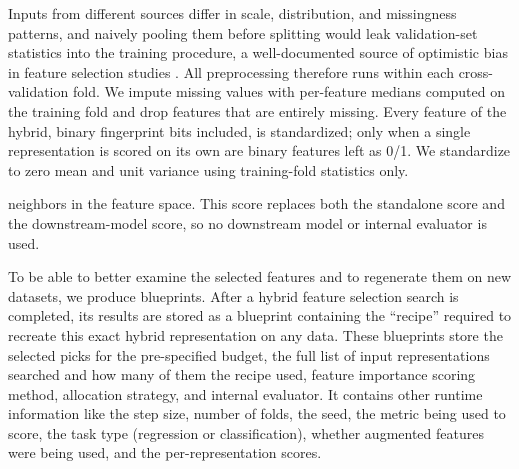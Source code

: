 Inputs from different sources differ in scale, distribution, and missingness patterns, and naively pooling them before splitting would leak validation-set statistics into the training procedure, a well-documented source of optimistic bias in feature selection studies \citep{Ambroise2002, Vabalas2019}. All preprocessing therefore runs within each cross-validation fold. We impute missing values with per-feature medians computed on the training fold and drop features that are entirely missing. Every feature of the hybrid, binary fingerprint bits included, is standardized; only when a single representation is scored on its own are binary features left as 0/1. We standardize to zero mean and unit variance using training-fold statistics only.

neighbors in the feature space. This score replaces both the standalone score and the downstream-model score, so no downstream model or internal evaluator is used.

To be able to better examine the selected features and to regenerate them on new datasets, we produce blueprints. After a hybrid feature selection search is completed, its results are stored as a blueprint containing the ``recipe'' required to recreate this exact hybrid representation on any data. These blueprints store the selected picks for the pre-specified budget, the full list of input representations searched and how many of them the recipe used, feature importance scoring method, allocation strategy, and internal evaluator. It contains other runtime information like the step size, number of folds, the seed, the metric being used to score, the task type (regression or classification), whether augmented features were being used, and the per-representation scores.

